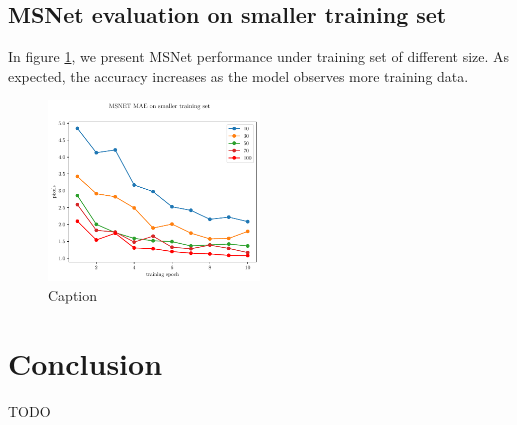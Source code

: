 \documentclass[runningheads]{llncs}
\begin{document}
\subsection{MSNet evaluation on smaller training set}

In figure \ref{fig:msnet_smaller_tr_set}, we present MSNet performance under training set of different size. As expected, the accuracy increases as the model observes more training data.

\begin{figure}[h]
    \centering
    \includegraphics[width=0.5\textwidth]{figures/freiburg_msnet_mae_smaller_training_set.pdf}
    \caption{Caption}
    \label{fig:msnet_smaller_tr_set}
\end{figure}

\section{Conclusion}
TODO



\end{document}
